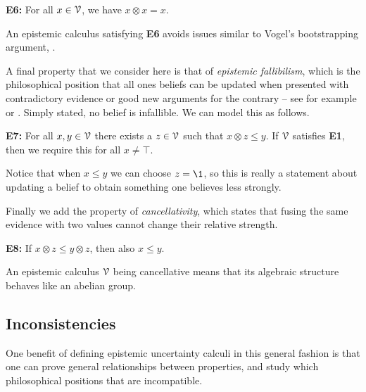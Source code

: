 \textbf{E6:} For all $x\in \EuScript{V}$, we have $x\otimes x = x$.

\begin{remark}
    An epistemic calculus satisfying \textbf{E6} avoids issues similar to Vogel's bootstrapping argument, \cite{vogel_2008}. 
\end{remark}

A final property that we consider here is that of \emph{epistemic fallibilism}, which is the philosophical position that all ones beliefs can be updated when presented with contradictory evidence or good new arguments for the contrary -- see for example \cite{kekes_1972} or \cite{feldman_1981}. Simply stated, no belief is infallible. We can model this as follows. 

\textbf{E7:} For all $x, y\in \EuScript{V}$ there exists a $z\in \EuScript{V}$ such that $x\otimes z \leq y$. If $\EuScript{V}$ satisfies \textbf{E1}, then we require this for all $x\neq \top$. 

Notice that when $x\leq y$ we can choose $z = \1$, so this is really a statement about updating a belief to obtain something one believes less strongly. 

Finally we add the property of \emph{cancellativity}, which states that fusing the same evidence with two values cannot change their relative strength. 

\textbf{E8:} If $x\otimes z \leq y \otimes z$, then also $x \leq y$. 

An epistemic calculus $\EuScript{V}$ being cancellative means that its algebraic structure behaves like an abelian group. 










\subsection{Inconsistencies}
One benefit of defining epistemic uncertainty calculi in this general fashion is that one can prove general relationships between properties, and study which philosophical positions that are incompatible. 




